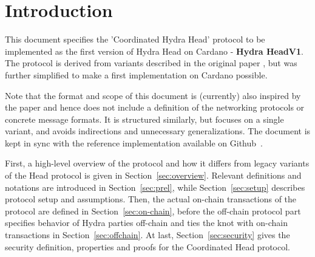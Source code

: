 \section{Introduction}
This document specifies the 'Coordinated Hydra Head' protocol to be implemented
as the first version of Hydra Head on Cardano - \textbf{Hydra HeadV1}. The
protocol is derived from variants described in the original paper
\cite{hydrahead20}, but was further simplified to make a first implementation on
Cardano possible.

Note that the format and scope of this document is (currently) also inspired by
the paper and hence does not include a definition of the networking protocols or
concrete message formats.  It
is structured similarly, but focuses on a single variant, and avoids
indirections and unnecessary generalizations. The document is kept in sync with
the reference implementation available on Github~\cite{hydra-repo}.

First, a high-level overview of the protocol and how it differs from legacy
variants of the Head protocol is given in Section~\ref{sec:overview}. Relevant
definitions and notations are introduced in Section~\ref{sec:prel}, while
Section~\ref{sec:setup} describes protocol setup and assumptions. Then, the
actual on-chain transactions of the protocol are defined in
Section~\ref{sec:on-chain}, before the off-chain protocol part specifies
behavior of Hydra parties off-chain and ties the knot with on-chain transactions
in Section~\ref{sec:offchain}. At last, Section~\ref{sec:security} gives the
security definition, properties and proofs for the Coordinated Head protocol.

